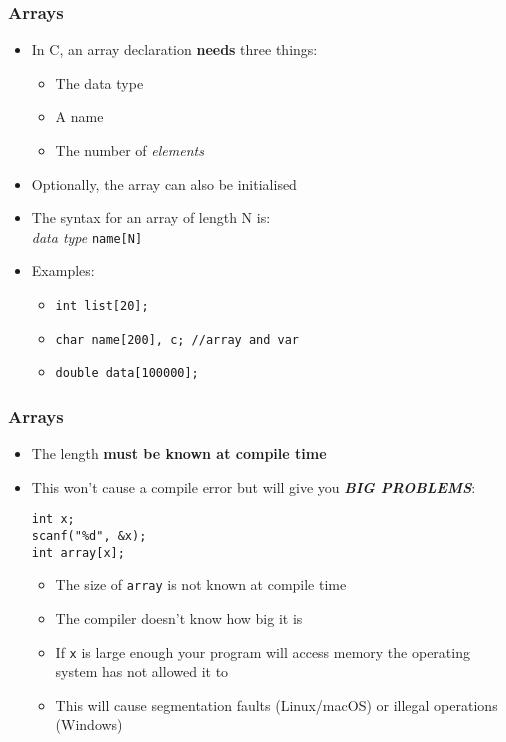 \documentclass[14pt]{beamer}
\begin{document}
\begin{frame}
\frametitle{Arrays}
\begin{itemize}
\item In C, an array declaration \textbf{needs} three things:
	\begin{itemize}
		\item The data type
		\item A name
		\item The number of \textit{elements}
	\end{itemize}
\item Optionally, the array can also be initialised
\item The syntax for an array of length N is:\\
\textit{data type} \texttt{name[N]}
\item Examples:
	\begin{itemize}
		\item \texttt{int list[20];}
		\item \texttt{char name[200], c; //array and var}
		\item \texttt{double data[100000];}
	\end{itemize}
\end{itemize}
\end{frame}

\begin{frame}[fragile]
\frametitle{Arrays}
\begin{itemize}
\item The length \textbf{must be known at compile time}
\item This won't cause a compile error but will give you \textbf{\textit{BIG PROBLEMS}}:
\begin{lstlisting}[style=CStyle]
int x;
scanf("%d", &x);
int array[x];
\end{lstlisting}
\pause
\begin{itemize}
\item The size of \texttt{array} is not known at compile time
\pause
\item The compiler doesn't know how big it is
\pause
\item If \texttt{x} is large enough your program will access memory the operating system has not allowed it to
\pause
\item This will cause segmentation faults (Linux/macOS) or illegal operations (Windows)
\end{itemize}
\end{itemize}
\end{frame}
\end{document}
